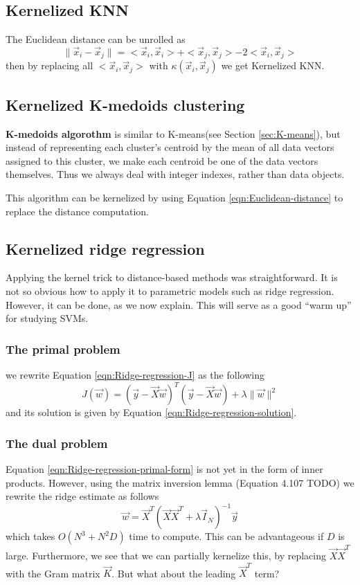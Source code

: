 \subsection{Kernelized KNN}
The Euclidean distance can be unrolled as
\begin{equation}\label{eqn:Euclidean-distance}
\lVert\vec{x}_i-\vec{x}_j\rVert=<\vec{x}_i,\vec{x}_i>+<\vec{x}_j,\vec{x}_j>-2<\vec{x}_i,\vec{x}_j>
\end{equation}
then by replacing all $<\vec{x}_i,\vec{x}_j>$ with $\kappa(\vec{x}_i,\vec{x}_j)$ we get Kernelized KNN.


\subsection{Kernelized K-medoids clustering}
\textbf{K-medoids algorothm} is similar to K-means(see Section \ref{sec:K-means}), but instead of representing each cluster’s centroid by the mean of all data vectors assigned to this cluster, we make each centroid be one of the data vectors themselves. Thus we always deal with integer indexes, rather than data objects.

This algorithm can be kernelized by using Equation \ref{eqn:Euclidean-distance} to replace the distance computation.


\subsection{Kernelized ridge regression}
Applying the kernel trick to distance-based methods was straightforward. It is not so obvious how to apply it to parametric models such as ridge regression. However, it can be done, as we now explain. This will serve as a good “warm up” for studying SVMs.


\subsubsection{The primal problem}
we rewrite Equation \ref{eqn:Ridge-regression-J} as the following
\begin{equation}\label{eqn:Ridge-regression-primal-form}
J(\vec{w})=(\vec{y}-\vec{X}\vec{w})^T(\vec{y}-\vec{X}\vec{w})+\lambda\lVert\vec{w}\rVert^2
\end{equation}
and its solution is given by Equation \ref{eqn:Ridge-regression-solution}.


\subsubsection{The dual problem}
Equation \ref{eqn:Ridge-regression-primal-form} is not yet in the form of inner products. However, using the matrix inversion lemma (Equation 4.107 TODO) we rewrite the ridge estimate as follows
\begin{equation}
\vec{w}=\vec{X}^T(\vec{X}\vec{X}^T+\lambda\vec{I}_N)^{-1}\vec{y}
\end{equation}
which takes $O(N^3+N^2D)$ time to compute. This can be advantageous if $D$ is large. Furthermore, we see that we can partially kernelize this, by replacing $\vec{X}\vec{X}^T$ with the Gram matrix $\vec{K}$. But what about the leading $\vec{X}^T$ term?


